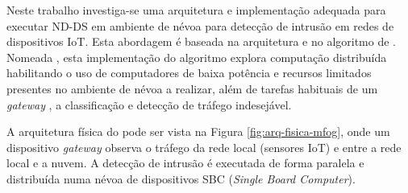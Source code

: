 



Neste trabalho investiga-se uma arquitetura e implementação adequada para
executar \acf{ND-DS} em ambiente de névoa para detecção de intrusão em redes de
dispositivos \acf{IoT}.
Esta abordagem é baseada na arquitetura \arch \cite{Cassales2019a} e no algoritmo
de \nd \minas \cite{Faria2016minas}.
Nomeada \mfog, esta implementação do algoritmo \minas explora computação distribuída
habilitando o uso de computadores de baixa potência e recursos limitados presentes no
ambiente de névoa a realizar, além de tarefas habituais de um \emph{gateway} \iot, a classificação e detecção de
tráfego indesejável.

A arquitetura física do \mfog pode ser vista na Figura
\ref{fig:arq-fisica-mfog}, onde um dispositivo \emph{gateway} observa o tráfego da rede local (sensores IoT) e entre a rede local e 
a nuvem. A detecção de intrusão é executada de forma paralela e distribuída numa névoa de 
dispositivos SBC (\emph{Single Board Computer}). 

